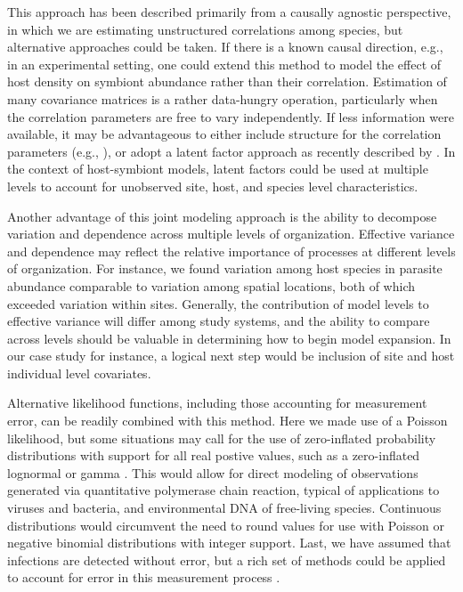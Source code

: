 This approach has been described primarily from a causally agnostic perspective, in which we are estimating unstructured correlations among species, but alternative approaches could be taken.
If there is a known causal direction, e.g., in an experimental setting, one could extend this method to model the effect of host density on symbiont abundance rather than their correlation.
Estimation of many covariance matrices is a rather data-hungry operation, particularly when the correlation parameters are free to vary independently.
If less information were available, it may be advantageous to either include structure for the correlation parameters (e.g., \citet{Dorazio2014}), or adopt a latent factor approach as recently described by \citet{Warton2015}.
In the context of host-symbiont models, latent factors could be used at multiple levels to account for unobserved site, host, and species level characteristics.

Another advantage of this joint modeling approach is the ability to decompose variation and dependence across multiple levels of organization.
Effective variance and dependence may reflect the relative importance of processes at different levels of organization.
For instance, we found variation among host species in parasite abundance comparable to variation among spatial locations, both of which exceeded variation within sites.
Generally, the contribution of model levels to effective variance will differ among study systems, and the ability to compare across levels should be valuable in determining how to begin model expansion.
In our case study for instance, a logical next step would be inclusion of site and host individual level covariates.

Alternative likelihood functions, including those accounting for measurement error, can be readily combined with this method.
Here we made use of a Poisson likelihood, but some situations may call for the use of zero-inflated probability distributions with support for all real postive values, such as a zero-inflated lognormal or gamma \citep{Miller2012a}.
This would allow for direct modeling of observations generated via quantitative polymerase chain reaction, typical of applications to viruses and bacteria, and environmental DNA of free-living species.
Continuous distributions would circumvent the need to round values for use with Poisson or negative binomial distributions with integer support.
Last, we have assumed that infections are detected without error, but a rich set of methods could be applied to account for error in this measurement process \citep{Lachish2012, Miller2012a}.

